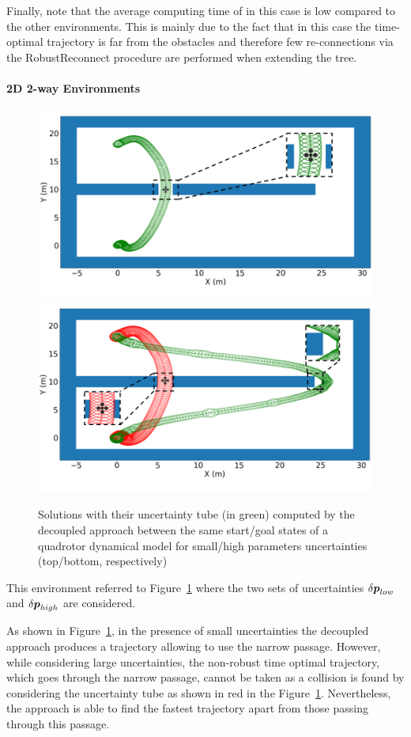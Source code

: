 Finally, note that the average computing time of  in this case is low compared to the other environments. 
This is mainly due to the fact that in this case the time-optimal trajectory is far from the obstacles and therefore few re-connections via the  RobustReconnect procedure are performed when extending the tree.

\paragraph{2D 2-way Environments} 

\begin{figure}[htp]
    \centering
    \includegraphics[width=0.7\linewidth]{figures/samp/Contribution-example1.png}
    \includegraphics[width=0.7\linewidth]{figures/samp/Contribution-example2.png}
    \caption{Solutions with their uncertainty tube (in green) computed by the decoupled approach between the same start/goal states of a quadrotor dynamical model for small/high parameters uncertainties (top/bottom, respectively)}
    \label{fig:2way}
\end{figure}

This environment referred to Figure~\ref{fig:2way} where the two sets of uncertainties $\delta\boldsymbol{p}_{low}$ and $\delta\boldsymbol{p}_{high}$ are considered.

As shown in Figure~\ref{fig:2way}, in the presence of small uncertainties the decoupled approach produces a trajectory allowing to use the narrow passage. 
However, while considering large uncertainties, the non-robust time optimal trajectory, which goes through the narrow passage, cannot be taken as a collision is found by considering the uncertainty tube as shown in red in the Figure~\ref{fig:2way}.
Nevertheless, the approach is able to find the fastest trajectory apart from those passing through this passage.

